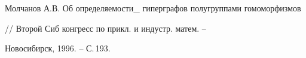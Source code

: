  


\vskip 2cm 


 






 


\label{end} 


 


 


 


\bibitem{} 


Молчанов А.В. Об определяемости_ гиперграфов полугруппами гомоморфизмов 


// Второй Сиб конгресс по прикл. и индустр. матем. -- 


Новосибирск, 1996. -- С.\,193. 


